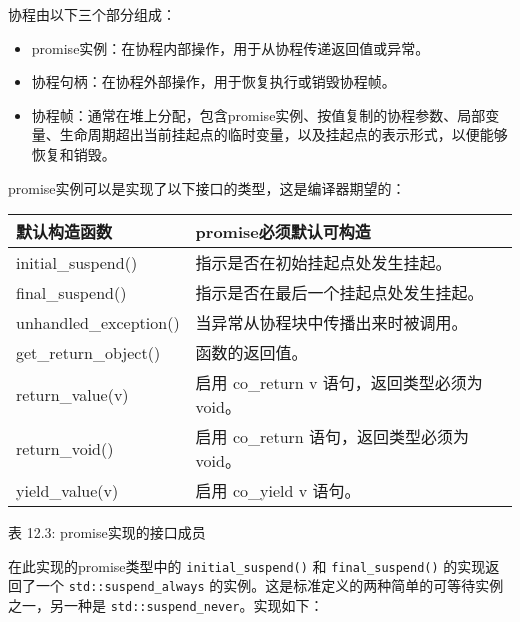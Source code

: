 协程由以下三个部分组成：

\begin{itemize}
\item
promise实例：在协程内部操作，用于从协程传递返回值或异常。

\item
协程句柄：在协程外部操作，用于恢复执行或销毁协程帧。

\item
协程帧：通常在堆上分配，包含promise实例、按值复制的协程参数、局部变量、生命周期超出当前挂起点的临时变量，以及挂起点的表示形式，以便能够恢复和销毁。
\end{itemize}

promise实例可以是实现了以下接口的类型，这是编译器期望的：

\begin{longtable}{|l|l|}
\hline
\textbf{默认构造函数} & \textbf{promise必须默认可构造}              \\ \hline
\endfirsthead
%
\endhead
%
initial\_suspend()     & 指示是否在初始挂起点处发生挂起。 \\ \hline
final\_suspend()             & 指示是否在最后一个挂起点处发生挂起。 \\ \hline
unhandled\_exception() & 当异常从协程块中传播出来时被调用。      \\ \hline
get\_return\_object()        & 函数的返回值。                               \\ \hline
return\_value(v)       & 启用 co\_return v 语句，返回类型必须为 void。  \\ \hline
return\_void()               & 启用 co\_return 语句，返回类型必须为 void。 \\ \hline
yield\_value(v)              & 启用 co\_yield v 语句。                              \\ \hline
\end{longtable}

\begin{center}
表 12.3: promise实现的接口成员
\end{center}

在此实现的promise类型中的 \verb|initial_suspend()| 和 \verb|final_suspend()| 的实现返回了一个 \verb|std::suspend_always| 的实例。这是标准定义的两种简单的可等待实例之一，另一种是 \verb|std::suspend_never|。实现如下：

